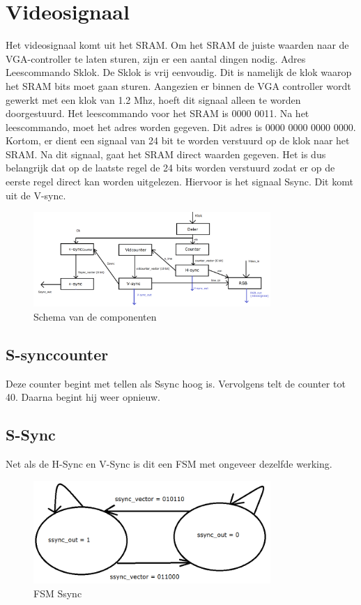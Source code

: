 \documentclass[oneside,dutch]{tudelft-report}
\begin{document}
\section{Videosignaal}
Het videosignaal komt uit het SRAM. Om het SRAM de juiste waarden naar de VGA-controller te laten sturen, zijn er een aantal dingen nodig.
Adres
Leescommando
Sklok.
De Sklok is vrij eenvoudig. Dit is namelijk de klok waarop het SRAM bits moet gaan sturen. Aangezien er binnen de VGA controller wordt gewerkt met een klok van 1.2 Mhz, hoeft dit signaal alleen te worden doorgestuurd. Het leescommando voor het SRAM is 0000 0011. Na het leescommando, moet het adres worden gegeven. Dit adres is 0000 0000 0000 0000. Kortom, er dient een signaal van 24 bit te worden verstuurd op de klok naar het SRAM. Na dit signaal, gaat het SRAM direct waarden gegeven. Het is dus belangrijk dat op de laatste regel de 24 bits worden verstuurd zodat er op de eerste regel direct kan worden uitgelezen. Hiervoor is het signaal Ssync. Dit komt uit de V-sync. 

\begin{figure}[H]
\center
\includegraphics[width=9cm]{schema-met-SRAM}
\caption{Schema van de componenten}
\label{VGA}
\end{figure}

\subsection{S-synccounter}
Deze counter begint met tellen als Ssync hoog is. Vervolgens telt de counter tot 40. Daarna begint hij weer opnieuw.

\subsection{S-Sync}
Net als de H-Sync en V-Sync is dit een FSM met ongeveer dezelfde werking. 

\begin{figure}[H]
\center
\includegraphics[width=9cm]{FSM-Ssync}
\caption{FSM Ssync}
\label{VGA}
\end{figure}
\end{document}
